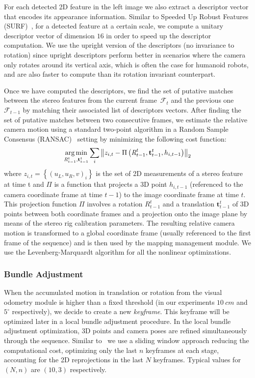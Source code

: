 For each detected 2D feature in the left image we also extract a descriptor vector that encodes its appearance information. Similar to Speeded Up Robust Features (SURF)~\cite{Bay08cviu}, for a detected
feature at a certain scale, we compute a unitary descriptor vector of dimension $16$ in order to speed up the descriptor computation. We use the upright version of the descriptors (no invariance to rotation)
since upright descriptors perform better in scenarios where the camera only rotates around its vertical axis, which is often the case for humanoid robots, and are also faster to compute than its rotation invariant counterpart.

Once we have computed the descriptors, we find the set of putative matches between the stereo features from the current frame~$\mathcal{F}_{t}$ and the previous one~$\mathcal{F}_{t-1}$ by matching their associated list of descriptors vectors. After finding the set of putative matches between two consecutive frames, we estimate the relative camera motion using a standard two-point algorithm in a Random Sample Consensus (RANSAC)~\cite{Bolles81ijcai} setting by minimizing the following cost function:
%
\begin{equation} \label{eq:three_pt}
\argmin_{\textit{R}_{t-1}^{t},\mathbf{t}_{t-1}^{t}} \sum\limits_{i} \left\| z_{i,t} - \Pi\left(\textit{R}_{t-1}^{t},\mathbf{t}_{t-1}^{t},h_{i,t-1}\right)\right\|_{2}
\end{equation}
%
where $z_{i,t}=\left\{\left(u_{L},u_{R},v\right)_{i}\right\}$ is the set of 2D measurements of a stereo feature at time t and $\Pi$ is a function that projects a 3D point $h_{i,t-1}$ (referenced to the camera coordinate frame at time $t-1$) to the image coordinate frame at time $t$. This projection function $\Pi$ involves a rotation $\textit{R}_{t-1}^{t}$ and a translation $\mathbf{t}_{t-1}^{t}$ of 3D
points between both coordinate frames and a projection onto the image plane by means of the stereo rig calibration parameters. The resulting relative camera motion is transformed to a global coordinate frame
(usually referenced to the first frame of the sequence) and is then used by the mapping management module. We use the Levenberg-Marquardt algorithm for all the nonlinear optimizations.

\subsubsection{Bundle Adjustment}\label{sec:ba}
When the accumulated motion in translation or rotation from the visual odometry module is higher than a fixed threshold (in our experiments $10~cm$ and $5^{\circ}$ respectively), we decide to create a new \textit{keyframe}. This keyframe will be optimized later in a local bundle adjustment procedure. In the local bundle adjustment optimization, 3D points and camera poses are refined simultaneously through the sequence. Similar to~\cite{Mouragnon09ivc} we use a sliding window approach reducing the computational cost, optimizing only the last $n$ keyframes at each stage, accounting for the 2D reprojections in the last $N$ keyframes. Typical values for $\left(N,n\right)$ are $\left(10,3\right)$ respectively.

